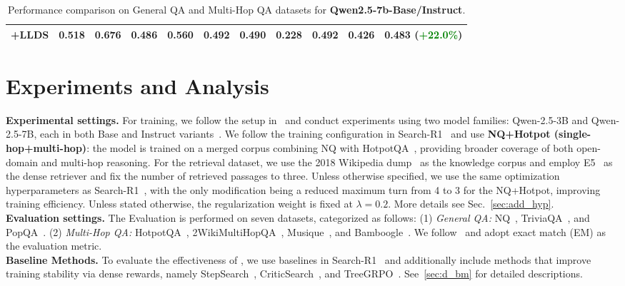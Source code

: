 \begin{table}[t]
{\begin{tabular}{l|ccc|c|cccc|c|c}
+LLDS     & \textbf{0.518} & \textbf{0.676} & \textbf{0.486} & \textbf{0.560} & \textbf{0.492} & \textbf{0.490} & \textbf{0.228} & \textbf{0.492} & \textbf{0.426} &  \textbf{0.483} (\textcolor{green}{+22.0\%})  \\ 
\bottomrule
\end{tabular}
}
\caption{Performance comparison on General QA and Multi-Hop QA datasets for \textbf{Qwen2.5-7b-Base/Instruct}. }
\label{tab:qa_results}
\vspace{-7mm}
\end{table}
\section{Experiments and Analysis}
\textbf{Experimental settings.} For training, we follow the setup in~\cite{jin2025search} and conduct experiments using two model families: Qwen-2.5-3B and Qwen-2.5-7B, each in both Base and Instruct variants~\citep{yang2024qwen2}. We follow the training configuration in Search-R1~\citep{jin2025search} and use \textbf{NQ+Hotpot (single-hop+multi-hop)}: the model is trained on a merged corpus combining NQ with HotpotQA~\citep{yang2018hotpotqa}, providing broader coverage of both open-domain and multi-hop reasoning. For the retrieval dataset, we use the 2018 Wikipedia dump~\citep{karpukhin2020dense} as the knowledge corpus and employ E5~\citep{wang2022text} as the dense retriever and fix the number of retrieved passages to three. Unless otherwise specified, we use the same optimization hyperparameters as Search-R1~\citep{jin2025search}, with the only modification being a reduced maximum turn from 4 to 3 for the NQ+Hotpot, improving training efficiency. Unless stated otherwise, the regularization weight is fixed at $\lambda = 0.2$. More details see Sec.~\ref{sec:add_hyp}.
\\
\textbf{Evaluation settings.} The Evaluation is performed on seven datasets, categorized as follows:
(1) \textit{General QA:} NQ~\citep{kwiatkowski2019natural}, TriviaQA~\citep{joshi2017triviaqa}, and PopQA~\citep{mallen2022not}.
(2) \textit{Multi-Hop QA:} HotpotQA~\citep{yang2018hotpotqa}, 2WikiMultiHopQA~\citep{ho2020constructing}, Musique~\citep{trivedi2022musique}, and Bamboogle~\citep{press2022measuring}. We follow~\cite{jin2025search} and adopt exact match (EM) as the evaluation metric. 
\\
\textbf{Baseline Methods.} To evaluate the effectiveness of \ours{}, we use baselines in Search-R1~\cite{jin2025search} and additionally include methods that improve training stability via dense rewards, namely StepSearch~\cite{zheng2025stepsearch}, CriticSearch~\citep{zhang2025criticsearch}, and TreeGRPO~\cite{ji2025tree}. See~\cref{sec:d_bm} for detailed descriptions.